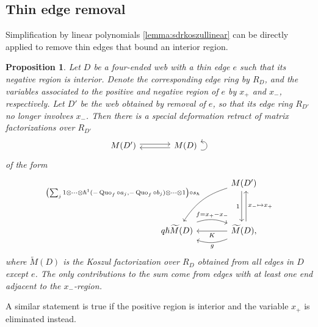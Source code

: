 \documentclass{article}
\DeclareMathOperator{\Quo}{Quo}
\newcommand{\sdr}[5]{%
  \begin{tikzcd}[column sep=large, ampersand replacement=\&]
    {#1} \arrow[r, "{#3}", shift left=0.5ex,] \arrow[r, leftarrow, "{#4}", shift right=0.5ex, swap] \& 
    #2 \arrow[loop right, distance=1em, in=15, out=-15, "{#5}",swap]
  \end{tikzcd}%
}
\theoremstyle{plain} %
\newtheorem{proposition}[theorem]{Proposition}
\theoremstyle{definition} %
\theoremstyle{remark} %
\begin{document}
\subsection{Thin edge removal}
Simplification by linear polynomials \ref{lemma:sdrkoszullinear} can be directly applied to remove thin edges that bound an interior region.
\begin{proposition}
	Let $D$ be a four-ended web with a thin edge $e$ such that its negative region is interior. Denote the corresponding edge ring by $R_D$, and the variables associated to the positive and negative region of $e$ by $x_+$ and $x_-$, respectively. Let $D'$ be the web obtained by removal of $e$, so that its edge ring $R_{D'}$ no longer involves $x_-$. Then there is a special deformation retract of matrix factorizations over $R_{D'}$
	$$\sdr{M(D')}{M(D)}{}{}{}$$ 
	of the form
	$$
	\begin{tikzcd}[column sep=large]
		&
		M(D')
		\ar[dd, shift right=0.6ex, "1", swap]
		\ar[dd, leftarrow, shift left=0.6ex, "x_-\mapsto x_+"]
		\arrow[ddl, "{\left(\sum_{j}1\otimes\cdots \otimes\hslash^1(-\Quo_f\circ a_j,-\Quo_f\circ b_j)\otimes\cdots\otimes 1\right)\circ s_\hslash}", bend right=20, swap]
		\\
		\\
		q \hslash \widetilde M(D)
		\arrow[r, "f=x_+-x_-", shift left=0.5ex, bend left=20]
		& 
		 \widetilde M(D)
		\ar[l, "K"]
		\arrow[l, "g", shift left=0.5ex, bend left=20]
		, 
	\end{tikzcd}
	$$
	where $\widetilde M(D)$ is the Koszul factorization over $R_D$ obtained from all edges in $D$ except $e$. The only contributions to the sum come from edges with at least one end adjacent to the $x_-$-region.
\end{proposition}

A similar statement is true if the positive region is interior and the variable $x_+$ is eliminated instead.
\end{document}
